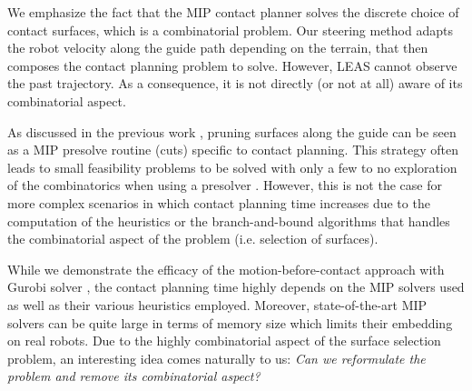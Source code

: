 We emphasize the fact that the MIP contact planner solves the discrete choice of contact surfaces, which is a combinatorial problem.
Our steering method adapts the robot velocity along the guide path depending on the terrain, that then composes the contact planning problem to solve. 
However, LEAS cannot observe the past trajectory. 
As a consequence, it is not directly (or not at all) aware of its combinatorial aspect. 

As discussed in the previous work \cite{sl1m_v2}, pruning surfaces along the guide can be seen as a MIP presolve routine (cuts) specific to contact planning.
This strategy often leads to small feasibility problems to be solved with only a few to no exploration of the combinatorics when using a presolver \cite{presolve_gurobi_2020}.
However, this is not the case for more complex scenarios in which contact planning time increases due to the computation of the heuristics or the branch-and-bound algorithms that handles the combinatorial aspect of the problem (i.e. selection of surfaces).

While we demonstrate the efficacy of the motion-before-contact approach with Gurobi solver \cite{gurobi}, the contact planning time highly depends on the MIP solvers used as well as their various heuristics employed.
Moreover, state-of-the-art MIP solvers can be quite large in terms of memory size which limits their embedding on real robots.
Due to the highly combinatorial aspect of the surface selection problem, an interesting idea comes naturally to us: \textit{Can we reformulate the problem and remove its combinatorial aspect?}





